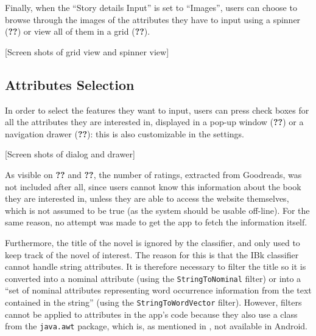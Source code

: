 \documentclass{mproj}
\begin{document}
Finally, when the ``Story details Input'' is set to ``Images'', users can choose to browse through the images of the attributes they have to input using a spinner (\textbf{??}) or view all of them in a grid (\textbf{??}).

[Screen shots of grid view and spinner view]

\subsection*{Attributes Selection}

In order to select the features they want to input, users can press check boxes for all the attributes they are interested in, displayed in a pop-up window (\textbf{??}) or a navigation drawer (\textbf{??}): this is also customizable in the settings.

[Screen shots of dialog and drawer]

As visible on \textbf{??} and \textbf{??}, the number of ratings, extracted from Goodreads, was not included after all, since users cannot know this information about the book they are interested in, unless they are able to access the website themselves, which is not assumed to be true (as the system should be usable off-line). For the same reason, no attempt was made to get the app to fetch the information itself. \par

Furthermore, the title of the novel is ignored by the classifier, and only used to keep track of the novel of interest. The reason for this is that the IBk classifier cannot handle string attributes. It is therefore necessary to filter the title so it is converted into a nominal attribute (using the \verb|StringToNominal| filter) or into a ``set of nominal attributes representing word occurrence information from the text contained in the string'' (using the \verb|StringToWordVector| filter). However, filters cannot be applied to attributes in the app's code because they also use a class from the \verb|java.awt| package, which is, as mentioned in , not available in Android.

\end{document}
